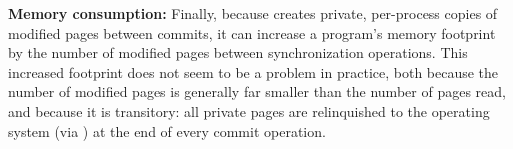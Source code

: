 

\textbf{Memory consumption: }
Finally, because \dthreads{} creates private, per-process copies of
modified pages between commits, it can increase a program's memory
footprint by the number of modified pages between synchronization
operations. This increased footprint does not seem to be a problem in
practice, both because the number of modified pages is generally far
smaller than the number of pages read, and because it is transitory:
all private pages are relinquished to the operating system
(via \madvise{}) at the end of every commit operation.



